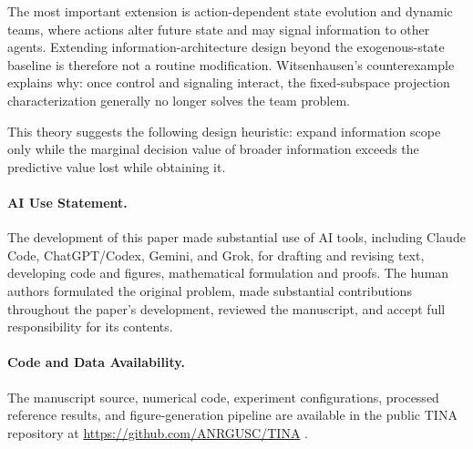 \documentclass[11pt]{article}
\begin{document}
The most important extension is action-dependent state evolution and dynamic
teams, where actions alter future state and may signal information to other
agents. Extending information-architecture design beyond the exogenous-state
baseline is therefore not a routine modification.
Witsenhausen's counterexample \cite{witsenhausen1968counterexample} explains
why: once control and signaling interact, the fixed-subspace projection
characterization generally no longer solves the team problem.

This theory suggests the following design heuristic: expand information
scope only while the marginal decision value of broader information exceeds
the predictive value lost while obtaining it.

\paragraph{AI Use Statement.}
The development of this paper made substantial use of AI tools, including
Claude Code, ChatGPT/Codex, Gemini, and Grok, for drafting and revising text,
developing code and figures, mathematical formulation and proofs.
The human authors formulated the original problem, made substantial
contributions throughout the paper's development, reviewed the manuscript, and
accept full responsibility for its contents.

\paragraph{Code and Data Availability.}
The manuscript source, numerical code, experiment configurations, processed
reference results, and figure-generation pipeline are available in the public
TINA repository at \url{https://github.com/ANRGUSC/TINA}
\cite{tina2026software}.



\end{document}
